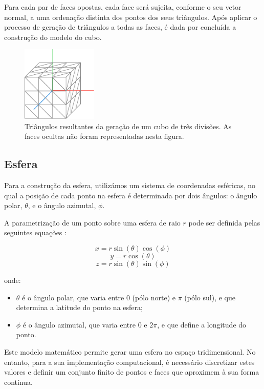 \documentclass[12pt, a4paper]{article}
\begin{document}
Para cada par de faces opostas, cada face será sujeita, conforme o seu vetor normal, a uma ordenação
distinta dos pontos dos seus triângulos. Após aplicar o processo de geração de triângulos a todas as
faces, é dada por concluída a construção do modelo do cubo.

\begin{figure}[H]
    \centering
    \includegraphics[width=0.32\textwidth]{res/figures/CubeTriangles.pdf}
    \caption{
        \onehalfspacing
        Triângulos resultantes da geração de um cubo de três divisões. As faces ocultas não foram
        representadas nesta figura.
    }
\end{figure}

\subsection{Esfera}

Para a construção da esfera, utilizámos um sistema de coordenadas esféricas, no qual a posição de
cada ponto na esfera é determinada por dois ângulos: o ângulo polar, $\theta$, e o ângulo azimutal,
$\phi$.

A parametrização de um ponto sobre uma esfera de raio \( r \) pode ser definida pelas seguintes
equações \cite{sphere}:

$$x = r \sin(\theta) \cos(\phi)$$
$$y = r \cos(\theta)$$
$$z = r \sin(\theta) \sin(\phi)$$

onde:
\begin{itemize}
    \item $\theta$ é o ângulo polar, que varia entre $0$ (pólo norte) e $\pi$ (pólo sul), e que
        determina a latitude do ponto na esfera;
    \item $\phi$ é o ângulo azimutal, que varia entre $0$ e $2\pi$, e que define a longitude do
        ponto.
\end{itemize}

Este modelo matemático permite gerar uma esfera no espaço tridimensional. No entanto, para a sua
implementação computacional, é necessário discretizar estes valores e definir um conjunto finito de
pontos e faces que aproximem à sua forma contínua.
\end{document}

